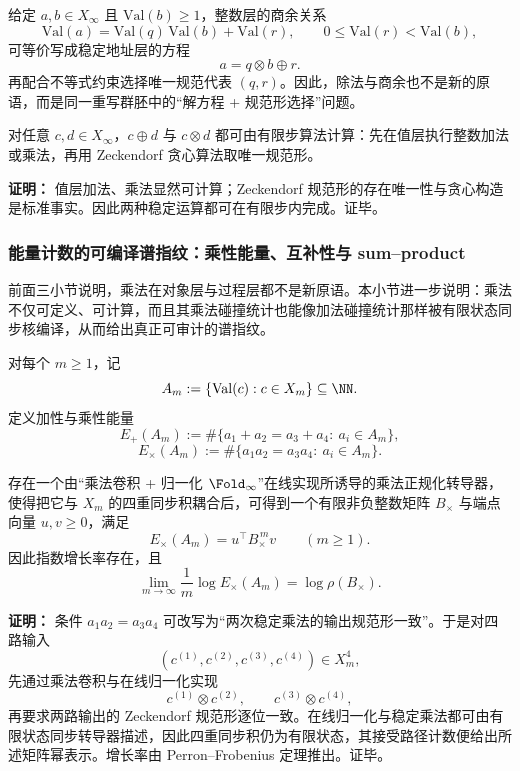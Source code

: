 \begin{remark}[商余作为规范形选择]\label{rem:division-as-selection}
给定 \(a,b\in X_\infty\) 且 \(\mathrm{Val}(b)\ge 1\)，整数层的商余关系
\[
\mathrm{Val}(a)=\mathrm{Val}(q)\,\mathrm{Val}(b)+\mathrm{Val}(r),
\qquad
0\le \mathrm{Val}(r)<\mathrm{Val}(b),
\]
可等价写成稳定地址层的方程
\[
a=q\otimes b\oplus r.
\]
再配合不等式约束选择唯一规范代表 \((q,r)\)。因此，除法与商余也不是新的原语，而是同一重写群胚中的“解方程 + 规范形选择”问题。
\end{remark}

\begin{proposition}[可计算实现]\label{prop:zeckendorf-arith-computable}
对任意 \(c,d\in X_\infty\)，\(c\oplus d\) 与 \(c\otimes d\) 都可由有限步算法计算：先在值层执行整数加法或乘法，再用 Zeckendorf 贪心算法取唯一规范形。
\end{proposition}

\textbf{证明：}
值层加法、乘法显然可计算；Zeckendorf 规范形的存在唯一性与贪心构造是标准事实。因此两种稳定运算都可在有限步内完成。证毕。

\subsubsection{能量计数的可编译谱指纹：乘性能量、互补性与 sum--product}\label{subsec:energy-compiled-sumproduct}
前面三小节说明，乘法在对象层与过程层都不是新原语。本小节进一步说明：乘法不仅可定义、可计算，而且其乘法碰撞统计也能像加法碰撞统计那样被有限状态同步核编译，从而给出真正可审计的谱指纹。

对每个 \(m\ge 1\)，记
\[
A_m:=\{\mathrm{Val}(c):c\in X_m\}\subseteq \NN.
\]
定义加性与乘性能量
\[
E_+(A_m):=
\#\{a_1+a_2=a_3+a_4:\ a_i\in A_m\},
\]
\[
E_\times(A_m):=
\#\{a_1a_2=a_3a_4:\ a_i\in A_m\}.
\]

\begin{proposition}[乘性能量同样可编译]\label{prop:conclusion71-multiplicative-energy-compilable}
存在一个由“乘法卷积 + 归一化 \(\Fold_\infty\)”在线实现所诱导的乘法正规化转导器，使得把它与 \(X_m\) 的四重同步积耦合后，可得到一个有限非负整数矩阵 \(B_\times\) 与端点向量 \(u,v\ge 0\)，满足
\[
E_\times(A_m)=u^\top B_\times^{\,m}v
\qquad (m\ge 1).
\]
因此指数增长率存在，且
\[
\lim_{m\to\infty}\frac{1}{m}\log E_\times(A_m)=\log \rho(B_\times).
\]
\end{proposition}

\textbf{证明：}
条件 \(a_1a_2=a_3a_4\) 可改写为“两次稳定乘法的输出规范形一致”。于是对四路输入
\[
(c^{(1)},c^{(2)},c^{(3)},c^{(4)})\in X_m^4,
\]
先通过乘法卷积与在线归一化实现
\[
c^{(1)}\otimes c^{(2)},\qquad c^{(3)}\otimes c^{(4)},
\]
再要求两路输出的 Zeckendorf 规范形逐位一致。在线归一化与稳定乘法都可由有限状态同步转导器描述，因此四重同步积仍为有限状态，其接受路径计数便给出所述矩阵幂表示。增长率由 Perron--Frobenius 定理推出。证毕。

